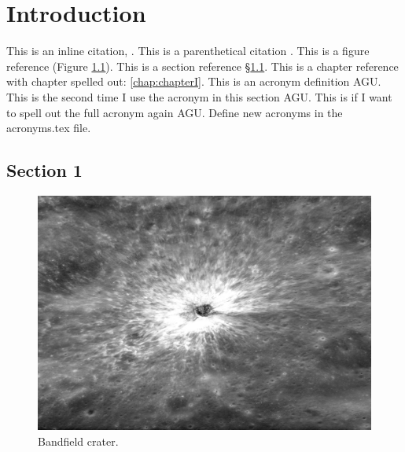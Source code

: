 \chapter{Introduction}
\label{chap:intro}
\acresetall

This is an inline citation, \cite{braden2013}. This is a parenthetical citation \citep{braden2013}. This is a figure reference (Figure \ref{fig:footprint}). This is a section reference \S\ref{sec:intro:section_1}. This is a chapter reference with chapter spelled out: \autoref{chap:chapterI}. This is an acronym definition \ac{AGU}. This is the second time I use the acronym in this section \ac{AGU}. This is if I want to spell out the full acronym again \acf{AGU}. Define new acronyms in the acronyms.tex file.


\section{Section 1}
\label{sec:intro:section_1}
\lipsum[1] 

\begin{figure}
\centering\includegraphics[width=\linewidth]{figs/chapter1/Bandfield_crater_AS17-P-2889.jpg}
\caption{Bandfield crater.}
\label{fig:footprint}
\end{figure}
\lipsum[1]
